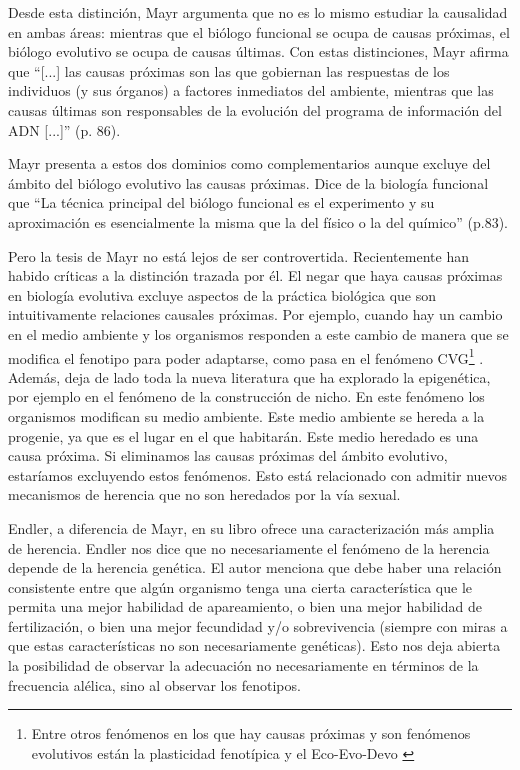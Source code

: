 Desde esta distinción, Mayr argumenta que no es lo mismo estudiar la causalidad en ambas áreas: mientras que el biólogo funcional se ocupa de causas próximas, el biólogo evolutivo se ocupa de causas últimas. Con estas distinciones, Mayr afirma que ``[...] las causas próximas son las que gobiernan las respuestas de los individuos (y sus órganos) a factores inmediatos del ambiente, mientras que las causas últimas son responsables de la evolución del programa de información del ADN [...]'' (p. 86).

Mayr presenta a estos dos dominios como complementarios aunque excluye del ámbito del biólogo evolutivo las causas próximas. Dice de la biología funcional que ``La técnica principal del biólogo funcional es el experimento y su aproximación es esencialmente la misma que la del físico o la del químico'' (p.83).

Pero la tesis de Mayr no está lejos de ser controvertida. Recientemente han habido críticas a la distinción trazada por él. El negar que haya causas próximas en biología evolutiva excluye aspectos de la práctica biológica que son intuitivamente relaciones causales próximas. Por ejemplo, cuando hay un cambio en el medio ambiente y los organismos responden a este cambio de manera que se modifica el fenotipo para poder adaptarse, como pasa en el fenómeno CVG\footnote{Entre otros fenómenos en los que hay causas próximas y son fenómenos evolutivos están la plasticidad fenotípica \cite{WESTEBERHARD20082701} y el Eco-Evo-Devo \cite{PfenningEco-Evo-Devo}} \cite{CVG}. Además, deja de lado toda la nueva literatura que ha explorado la epigenética, por ejemplo en el fenómeno de la construcción de nicho. En este fenómeno los organismos modifican su medio ambiente. Este medio ambiente se hereda a la progenie, ya que es el lugar en el que habitarán. Este medio heredado es una causa próxima. Si eliminamos las causas próximas del ámbito evolutivo, estaríamos excluyendo estos fenómenos. Esto está relacionado con admitir nuevos mecanismos de herencia que no son heredados por la vía sexual.

Endler, a diferencia de Mayr, en su libro \citeyear{Endler1986} ofrece una caracterización más amplia de herencia. Endler nos dice que no necesariamente el fenómeno de la herencia depende de la herencia genética. El autor menciona que debe haber una relación consistente entre que algún organismo tenga una cierta característica que le permita una mejor habilidad de apareamiento, o bien una mejor habilidad de fertilización, o bien una mejor fecundidad y/o sobrevivencia (siempre con miras a que estas características no son necesariamente genéticas). Esto nos deja abierta la posibilidad de observar la adecuación no necesariamente en términos de la frecuencia alélica, sino al observar los fenotipos.

